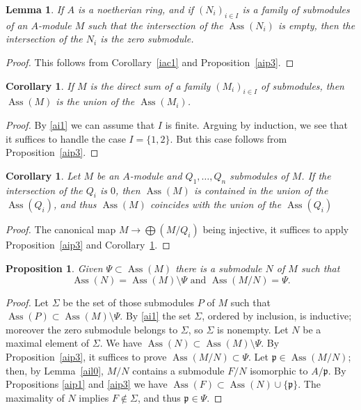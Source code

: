 \documentclass[parskip=half,fontsize=12pt]{scrartcl}%
\newcommand{\oo}{\operatorname}\newcommand{\ooo}{\operatorname*}
\newcommand{\mf}{\mathfrak}
\newcommand{\ppp}{\mf p}
\newcommand{\Ass}{\oo{Ass}}
\newtheorem{cor}[thm]{Corollary}
\newtheorem{lem}[thm]{Lemma}
\newtheorem{prop}[thm]{Proposition}
\begin{document}
\begin{lem}\label{aimyl1}
If $A$ is a noetherian ring, and if $(N_i)_{i\in I}$ is a family of submodules of an $A$-module $M$ such that the intersection of the $\Ass(N_i)$ is empty, then the intersection of the $N_i$ is the zero submodule.
\end{lem}
\begin{proof}
This follows from Corollary~\ref{iac1} and Proposition~\ref{aip3}.
\end{proof}

\begin{cor}\label{aic1}%
If $M$ is the direct sum of a family $(M_i)_{i\in I}$ of submodules, then $\Ass(M)$ is the union of the $\Ass(M_i)$.%
\end{cor}
\begin{proof}
By \eqref{ai1} we can assume that $I$ is finite. Arguing by induction, we see that it suffices to handle the case $I=\{1,2\}$. But this case follows from Proposition~\ref{aip3}.
\end{proof}

\begin{cor}\label{aimc11}%
Let $M$ be an $A$-module and $Q_1,\dots,Q_n$ submodules of $M$. If the intersection of the $Q_i$ is $0$, then $\Ass(M)$ is contained in the union of the $\Ass(Q_i)$, and thus $\Ass(M)$ coincides with the union of the $\Ass(Q_i)$
\end{cor}
\begin{proof}
The canonical map $M\to\bigoplus(M/Q_i)$ being injective, it suffices to apply Proposition~\ref{aip3} and Corollary~\ref{aic1}.
\end{proof}

\begin{prop}\label{aip4}%
Given $\Psi\subset\Ass(M)$ there is a submodule $N$ of $M$ such that 
$$
\Ass(N)=\Ass( M )\setminus\Psi\text{ and }\Ass(M/N)=\Psi.
$$ 
\end{prop}
\begin{proof}
Let $\Sigma$ be the set of those submodules $P$ of $M$ such that $\Ass(P)\subset\Ass( M )\setminus\Psi$. By \eqref{ai1} the set $\Sigma$, ordered by inclusion, is inductive; moreover the zero submodule belongs to $\Sigma$, so $\Sigma$ is nonempty. Let $N$ be a maximal element of $\Sigma$. We have $\Ass(N)\subset\Ass( M )\setminus\Psi$. By Proposition~\ref{aip3}, it suffices to prove $\Ass(M/N)\subset\Psi$. %
Let $\ppp\in\Ass(M/N)$; then, by Lemma~\ref{ail0}, $M/N$ contains a submodule $F/N$ isomorphic to $A/\ppp$. By Propositions \ref{aip1} and \ref{aip3} we have $\Ass(F)\subset\Ass(N)\cup\{\ppp\}$. The maximality of $N$ implies $F\notin\Sigma$, and thus $\ppp\in\Psi$.
\end{proof}
\end{document}
